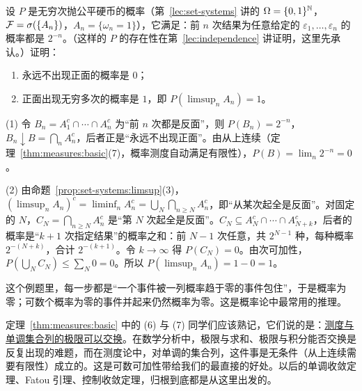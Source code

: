 \begin{workedexample}\label{we:measures:coin-continuity}
设 $P$ 是无穷次抛公平硬币的概率（第~\ref{lec:set-systems} 讲的 $\Omega=\{0,1\}^{\mathbb{N}}$，$\mathcal{F}=\sigma(\{A_n\})$，$A_n=\{\omega_n=1\}$），它满足：前 $n$ 次结果为任意给定的 $\varepsilon_1,\dots,\varepsilon_n$ 的概率都是 $2^{-n}$。（这样的 $P$ 的存在性在第~\ref{lec:independence} 讲证明，这里先承认。）证明：
\begin{enumerate}
\item 永远不出现正面的概率是 $0$；
\item 正面出现无穷多次的概率是 $1$，即 $P(\limsup_nA_n)=1$。
\end{enumerate}
\end{workedexample}
\begin{solution}
(1) 令 $B_n=A_1^c\cap\cdots\cap A_n^c$ 为“前 $n$ 次都是反面”，则 $P(B_n)=2^{-n}$，$B_n\downarrow B=\bigcap_nA_n^c$，后者正是“永远不出现正面”。由从上连续（定理~\ref{thm:measures:basic}(7)，概率测度自动满足有限性），$P(B)=\lim_n2^{-n}=0$。

(2) 由命题~\ref{prop:set-systems:limsup}(3)，$(\limsup_nA_n)^c=\liminf_nA_n^c=\bigcup_N\bigcap_{n\geqslant N}A_n^c$，即“从某次起全是反面”。对固定的 $N$，$C_N=\bigcap_{n\geqslant N}A_n^c$ 是“第 $N$ 次起全是反面”。$C_N\subseteq A_N^c\cap\cdots\cap A_{N+k}^c$，后者的概率是“$k+1$ 次指定结果”的概率之和：前 $N-1$ 次任意，共 $2^{N-1}$ 种，每种概率 $2^{-(N+k)}$，合计 $2^{-(k+1)}$。令 $k\to\infty$ 得 $P(C_N)=0$。由次可加性，$P(\bigcup_NC_N)\leqslant\sum_N0=0$。所以 $P(\limsup_nA_n)=1-0=1$。

这个例题里，每一步都是“一个事件被一列概率趋于零的事件包住”，于是概率为零；可数个概率为零的事件并起来仍然概率为零。这是概率论中最常用的推理。
\end{solution}

\begin{remark}
定理~\ref{thm:measures:basic} 中的 (6) 与 (7) 同学们应该熟记，它们说的是：\uline{测度与单调集合列的极限可以交换}。在数学分析中，极限与求和、极限与积分能否交换是反复出现的难题，而在测度论中，对单调的集合列，这件事是无条件（从上连续需要有限性）成立的。这是可数可加性带给我们的最直接的好处。以后的单调收敛定理、Fatou 引理、控制收敛定理，归根到底都是从这里出发的。
\end{remark}

